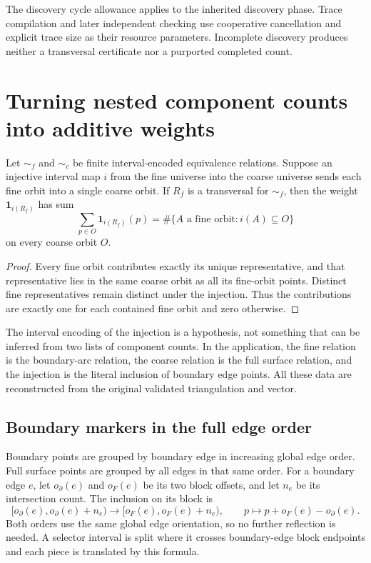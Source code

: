 The discovery cycle allowance applies to the inherited discovery phase.
Trace compilation and later independent checking use cooperative cancellation
and explicit trace size as their resource parameters. Incomplete discovery
produces neither a transversal certificate nor a purported completed count.

\section{Turning nested component counts into additive weights}
\label{sec:nested}

\begin{theorem}
\label{thm:nested}
Let $\sim_f$ and $\sim_c$ be finite interval-encoded equivalence relations.
Suppose an injective interval map $i$ from the fine universe into the coarse
universe sends each fine orbit into a single coarse orbit. If $R_f$ is a
transversal for $\sim_f$, then the weight $\mathbf1_{i(R_f)}$ has sum
\[
 \sum_{p\in O}\mathbf1_{i(R_f)}(p)
 =\#\{A\text{ a fine orbit}:i(A)\subseteq O\}
\]
on every coarse orbit $O$.
\end{theorem}
\begin{proof}
Every fine orbit contributes exactly its unique representative, and that
representative lies in the same coarse orbit as all its fine-orbit points.
Distinct fine representatives remain distinct under the injection. Thus
the contributions are exactly one for each contained fine orbit and zero
otherwise.
\end{proof}

The interval encoding of the injection is a hypothesis, not something that
can be inferred from two lists of component counts. In the application,
the fine relation is the boundary-arc relation, the coarse relation is the
full surface relation, and the injection is the literal inclusion of
boundary edge points. All these data are reconstructed from the original
validated triangulation and vector.

\subsection{Boundary markers in the full edge order}

Boundary points are grouped by boundary edge in increasing global edge
order. Full surface points are grouped by all edges in that same order.
For a boundary edge $e$, let $o_\partial(e)$ and $o_F(e)$ be its two block
offsets, and let $n_e$ be its intersection count. The inclusion on its block is
\[
 [o_\partial(e),o_\partial(e)+n_e)\longrightarrow
 [o_F(e),o_F(e)+n_e),\qquad
 p\longmapsto p+o_F(e)-o_\partial(e).
\]
Both orders use the same global edge orientation, so no further reflection
is needed. A selector interval is split where it crosses boundary-edge
block endpoints and each piece is translated by this formula.

